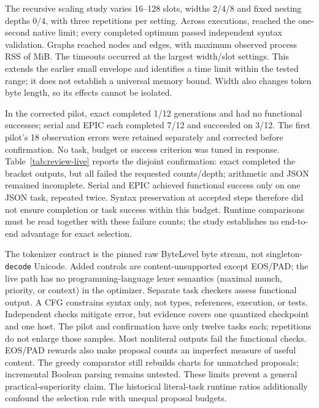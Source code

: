 The recursive scaling study varies 16--128 slots, widths 2/4/8 and fixed nesting depths 0/4, with three repetitions per setting. Across \MReviewScalingCases{} executions, \MReviewScalingTimeouts{} reached the one-second native limit; every completed optimum passed independent syntax validation. Graphs reached \MReviewScalingMaxNodes{} nodes and \MReviewScalingMaxEdges{} edges, with maximum observed process RSS of \MReviewScalingMaxMiB{} MiB. The timeouts occurred at the largest width/slot settings. This extends the earlier small envelope and identifies a time limit within the tested range; it does not establish a universal memory bound. Width also changes token byte length, so its effects cannot be isolated.

In the corrected pilot, exact completed 1/12 generations and had no functional successes; serial and EPIC each completed 7/12 and succeeded on 3/12. The first pilot's 18 observation errors were retained separately and corrected before confirmation. No task, budget or success criterion was tuned in response. Table~\ref{tab:review-live} reports the disjoint confirmation: exact completed the bracket outputs, but all failed the requested counts/depth; arithmetic and JSON remained incomplete. Serial and EPIC achieved functional success only on one JSON task, repeated twice. Syntax preservation at accepted steps therefore did not ensure completion or task success within this budget. Runtime comparisons must be read together with these failure counts; the study establishes no end-to-end advantage for exact selection.

The tokenizer contract is the pinned raw ByteLevel byte stream, not singleton-\texttt{decode} Unicode. Added controls are content-unsupported except EOS/PAD; the live path has no programming-language lexer semantics (maximal munch, priority, or context) in the optimizer. Separate task checkers assess functional output. A CFG constrains syntax only, not types, references, execution, or tests. Independent checks mitigate error, but evidence covers one quantized checkpoint and one host. The pilot and confirmation have only twelve tasks each; repetitions do not enlarge those samples. Most nonliteral outputs fail the functional checks. EOS/PAD rewards also make proposal counts an imperfect measure of useful content. The greedy comparator still rebuilds charts for unmatched proposals; incremental Boolean parsing remains untested. These limits prevent a general practical-superiority claim. The historical literal-task runtime ratios additionally confound the selection rule with unequal proposal budgets.


